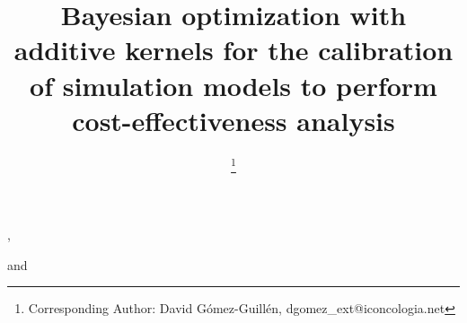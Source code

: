 \documentclass{IOS-Book-Article}
\def\hb{\hbox to 11.5 cm{}}
\begin{document}
	
	\pagestyle{headings}
	\def\thepage{}
	\begin{frontmatter}              %
		
		
		\title{Bayesian optimization with additive kernels for the calibration of simulation models to perform cost-effectiveness analysis}
		
		\markboth{}{April 2023\hb}
		
		\author[A,B]{ %
			\thanks{Corresponding Author: David Gómez-Guillén, dgomez\_ext@iconcologia.net}},
		\author[B,C]{ }
		\author[D]{ }
		and
		\author[D]{ }
		
		\address[A]{Universitat Autònoma de Barcelona (UAB)}
		\address[B]{Institut Català d'Oncologia (ICO) - Institut d'Investigació Biomèdica de Bellvitge (IDIBELL)}
		\address[C]{Consortium for Biomedical Research in Epidemiology and Public Health - CIBERESP. Carlos III Institute of Health}
		\address[D]{Institut d'Investigació en Intel·ligència Artificial - Consell Superior d'Investigacions Científiques (IIIA-CSIC)}
		

\end{frontmatter}
\end{document}
